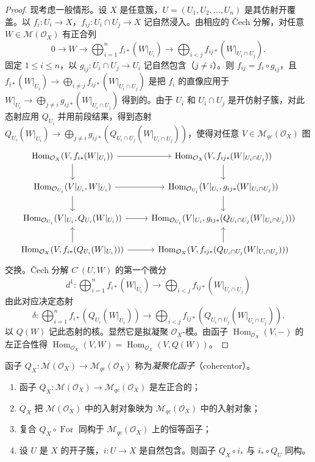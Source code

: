 \begin{proof}
现考虑一般情形。设 $X$ 是任意簇，$U=(U_1,U_2,\dots,U_n)$ 是其仿射开覆盖。以 $f_i:U_i\to X$，$f_{ij}:U_i\cap U_j\to X$ 记自然浸入。由相应的 Čech 分解，对任意 $W\in\mathcal{M}(\mathcal{O}_X)$ 有正合列
$$0\longrightarrow W\longrightarrow\bigoplus_{i=1}^n f_{i*}(W|_{U_i})\longrightarrow\bigoplus_{i<j}f_{ij*}(W|_{U_i\cap U_j}).$$
固定 $1\le i\le n$，以 $g_{ij}:U_i\cap U_j\to U_i$ 记自然包含（$j\neq i$）。则 $f_{ij}=f_i\circ g_{ij}$，且 $f_{i*}(W|_{U_i})\to\bigoplus_{i\neq j}f_{ij*}(W|_{U_i\cap U_j})$ 是把 $f_i$ 的直像应用于 $W|_{U_i}\to\bigoplus_{j\neq i}g_{ij*}(W|_{U_i\cap U_j})$ 得到的。由于 $U_i$ 和 $U_i\cap U_j$ 是开仿射子簇，对此态射应用 $Q_{U_i}$ 并用前段结果，得到态射 $Q_{U_i}(W|_{U_i})\to\bigoplus_{j\neq i}g_{ij*}(Q_{U_i\cap U_j}(W|_{U_i\cap U_j}))$，使得对任意 $V\in\mathcal{M}_{qc}(\mathcal{O}_X)$ 图
$$\begin{tikzcd}
\operatorname{Hom}_{\mathcal{O}_X}(V,f_{i*}(W|_{U_i})) \arrow[r] \arrow[d] & \operatorname{Hom}_{\mathcal{O}_X}(V,f_{ij*}(W|_{U_i\cap U_j})) \arrow[d]\\
\operatorname{Hom}_{\mathcal{O}_{U_i}}(V|_{U_i},W|_{U_i}) \arrow[r] \arrow[d] & \operatorname{Hom}_{\mathcal{O}_{U_i}}(V|_{U_i},g_{ij*}(W|_{U_i\cap U_j})) \arrow[d]\\
\operatorname{Hom}_{\mathcal{O}_{U_i}}(V|_{U_i},Q_{U_i}(W|_{U_i})) \arrow[r] & \operatorname{Hom}_{\mathcal{O}_{U_i}}(V|_{U_i},g_{ij*}(Q_{U_i\cap U_j}(W|_{U_i\cap U_j})))\\
\operatorname{Hom}_{\mathcal{O}_X}(V,f_{i*}(Q_{U_i}(W|_{U_i}))) \arrow[u] \arrow[r] & \operatorname{Hom}_{\mathcal{O}_X}(V,f_{ij*}(Q_{U_i\cap U_j}(W|_{U_i\cap U_j}))) \arrow[u]
\end{tikzcd}$$
交换。Čech 分解 $C^\cdot(U,W)$ 的第一个微分
$$d^1:\bigoplus_{i=1}^nf_{i*}(W|_{U_i})\longrightarrow\bigoplus_{i<j}f_{ij*}(W|_{U_i\cap U_j})$$
由此对应决定态射
$$\delta:\bigoplus_{i=1}^nf_{i*}(Q_{U_i}(W|_{U_i}))\longrightarrow\bigoplus_{i<j}f_{ij*}(Q_{U_i\cap U_j}(W|_{U_i\cap U_j})).$$
以 $Q(W)$ 记此态射的核。显然它是拟凝聚 $\mathcal{O}_X$-模。由函子 $\operatorname{Hom}_{\mathcal{O}_X}(V,-)$ 的左正合性得 $\operatorname{Hom}_{\mathcal{O}_X}(V,W)=\operatorname{Hom}_{\mathcal{O}_X}(V,Q(W))$。
\end{proof}

函子 $Q_X:\mathcal{M}(\mathcal{O}_X)\to\mathcal{M}_{qc}(\mathcal{O}_X)$ 称为\emph{凝聚化函子}（coherentor）。

\begin{proposition}
\begin{enumerate}[label=(\roman*)]
  \item 函子 $Q_X:\mathcal{M}(\mathcal{O}_X)\to\mathcal{M}_{qc}(\mathcal{O}_X)$ 是左正合的；
  \item $Q_X$ 把 $\mathcal{M}(\mathcal{O}_X)$ 中的入射对象映为 $\mathcal{M}_{qc}(\mathcal{O}_X)$ 中的入射对象；
  \item 复合 $Q_X\circ\operatorname{For}$ 同构于 $\mathcal{M}_{qc}(\mathcal{O}_X)$ 上的恒等函子；
  \item 设 $U$ 是 $X$ 的开子簇，$i:U\to X$ 是自然包含。则函子 $Q_X\circ i_*$ 与 $i_*\circ Q_U$ 同构。
\end{enumerate}
\end{proposition}

